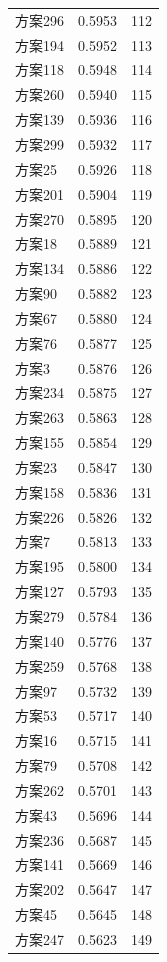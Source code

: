 \documentclass[12pt,a4paper]{article}
\begin{document}
\begin{table}[H]
\begin{tabular}{lcc}
    方案296 & 0.5953 & 112 \\
    方案194 & 0.5952 & 113 \\
    方案118 & 0.5948 & 114 \\
    方案260 & 0.5940 & 115 \\
    方案139 & 0.5936 & 116 \\
    方案299 & 0.5932 & 117 \\
    方案25 & 0.5926 & 118 \\
    方案201 & 0.5904 & 119 \\
    方案270 & 0.5895 & 120 \\
    方案18 & 0.5889 & 121 \\
    方案134 & 0.5886 & 122 \\
    方案90 & 0.5882 & 123 \\
    方案67 & 0.5880 & 124 \\
    方案76 & 0.5877 & 125 \\
    方案3 & 0.5876 & 126 \\
    方案234 & 0.5875 & 127 \\
    方案263 & 0.5863 & 128 \\
    方案155 & 0.5854 & 129 \\
    方案23 & 0.5847 & 130 \\
    方案158 & 0.5836 & 131 \\
    方案226 & 0.5826 & 132 \\
    方案7 & 0.5813 & 133 \\
    方案195 & 0.5800 & 134 \\
    方案127 & 0.5793 & 135 \\
    方案279 & 0.5784 & 136 \\
    方案140 & 0.5776 & 137 \\
    方案259 & 0.5768 & 138 \\
    方案97 & 0.5732 & 139 \\
    方案53 & 0.5717 & 140 \\
    方案16 & 0.5715 & 141 \\
    方案79 & 0.5708 & 142 \\
    方案262 & 0.5701 & 143 \\
    方案43 & 0.5696 & 144 \\
    方案236 & 0.5687 & 145 \\
    方案141 & 0.5669 & 146 \\
    方案202 & 0.5647 & 147 \\
    方案45 & 0.5645 & 148 \\
    方案247 & 0.5623 & 149 \\

\end{tabular}
\end{table}
\end{document}
